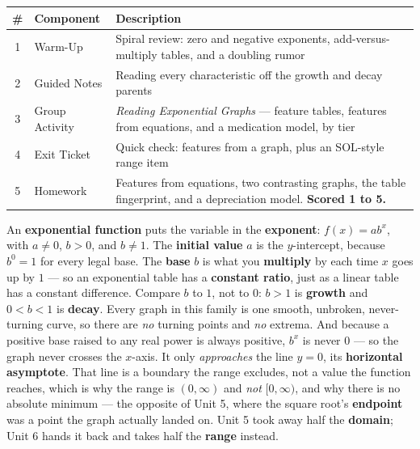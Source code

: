 \documentclass[10pt]{article}
\begin{document}
\begin{tocbox}
\small
\renewcommand{\arraystretch}{1.5}
\begin{tabularx}{\linewidth}{@{} c l X @{}}
\rowcolor{forestbg}
\textbf{\#} & \textbf{Component} & \textbf{Description} \\
\midrule
1 & Warm-Up        & Spiral review: zero and negative exponents, add-versus-multiply tables, and a doubling rumor \\
2 & Guided Notes   & Reading every characteristic off the growth and decay parents \\
3 & Group Activity & \emph{Reading Exponential Graphs} --- feature tables, features from equations, and a medication model, by tier \\
4 & Exit Ticket    & Quick check: features from a graph, plus an SOL-style range item \\
5 & Homework       & Features from equations, two contrasting graphs, the table fingerprint, and a depreciation model. \textbf{Scored 1 to 5.} \\
\end{tabularx}
\end{tocbox}

\vspace{0.10in}

\begin{remindbox}
\small An \textbf{exponential function} puts the variable in the \textbf{exponent}:
$f(x)=ab^{x}$, with $a\ne 0$, $b>0$, and $b\ne 1$. The \textbf{initial value} $a$ is the
$y$-intercept, because $b^{0}=1$ for every legal base. The \textbf{base} $b$ is what you
\textbf{multiply} by each time $x$ goes up by $1$ --- so an exponential table has a \textbf{constant
ratio}, just as a linear table has a constant difference. Compare $b$ to $1$, not to $0$: $b>1$ is
\textbf{growth} and $0<b<1$ is \textbf{decay}. Every graph in this family is one smooth, unbroken,
never-turning curve, so there are \emph{no} turning points and \emph{no} extrema. And because a
positive base raised to any real power is always positive, $b^{x}$ is never $0$ --- so the graph
never crosses the $x$-axis. It only \emph{approaches} the line $y=0$, its \textbf{horizontal
asymptote}. That line is a boundary the range excludes, not a value the function reaches, which is
why the range is $(0,\infty)$ and \emph{not} $[0,\infty)$, and why there is no absolute minimum ---
the opposite of Unit 5, where the square root's \textbf{endpoint} was a point the graph actually
landed on. Unit 5 took away half the \textbf{domain}; Unit 6 hands it back and takes half the
\textbf{range} instead.
\end{remindbox}
\end{document}
